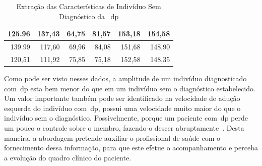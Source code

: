 \begin{table}[h]
\begin{tabular}{|r|r|r|r|r|r|}
125.96                                                                                   & 137,43                                                                                   & 64,75                                                              & 81,57                                                             & 153,18            & 154,58             \\ \hline
139.99                                                                                   & 117,60                                                                                   & 69,96                                                              & 84,08                                                             & 151,68            & 148,90             \\ \hline
120,51                                                                                   & 111,92                                                                                   & 75,85                                                              & 75,18                                                             & 152,58            & 148,35             \\ \hline
\end{tabular}
\caption{Extração das Características de Indivíduo Sem Diagnóstico da ~\ac{dp}}
\label{table:extracao_caracterisca_saudavel}
\end{table}

Como pode ser visto nesses dados, a amplitude de um indivíduo diagnosticado com~\ac{dp} esta bem menor do que em um indivíduo sem o diagnóstico estabelecido. Um valor importante também pode ser identificado na velocidade de adução esquerda do indivíduo com~\ac{dp}, possui uma velocidade muito maior do que o indivíduo sem o diagnóstico. Possivelmente, porque um paciente com~\ac{dp} perde um pouco o controle sobre o membro, fazendo-o descer abruptamente~\cite{protpar010}. Desta maneira, a abordagem pretende auxiliar o profissional de saúde com o fornecimento dessa informação, para que este efetue o acompanhamento e perceba a evolução do quadro clínico do paciente. 


%

